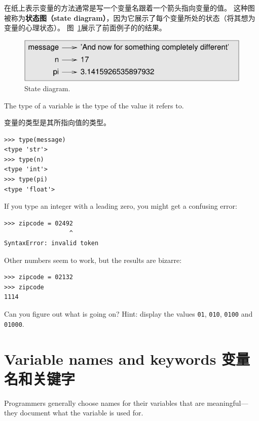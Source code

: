 \documentclass[10pt]{book}
\begin{document}
\begin{CJK}{UTF8}{gbsn}
在纸上表示变量的方法通常是写一个变量名跟着一个箭头指向变量的值。
这种图被称为{\bf 状态图（state diagram）}，因为它展示了每个变量所处的状态（将其想为变量的心理状态）。
图~\ref{fig.state2}展示了前面例子的的结果。

\begin{figure}
\centerline
{\includegraphics[scale=0.8]{figs/state2.pdf}}
\caption{State diagram.}
\label{fig.state2}
\end{figure}

The type of a variable is the type of the value it refers to.

变量的类型是其所指向值的类型。

\begin{verbatim}
>>> type(message)
<type 'str'>
>>> type(n)
<type 'int'>
>>> type(pi)
<type 'float'>
\end{verbatim}

\begin{exercise}

If you type an integer with a leading zero, you might get
a confusing error:

\begin{verbatim}
>>> zipcode = 02492
                  ^
SyntaxError: invalid token
\end{verbatim}

Other numbers seem to work, but the results are bizarre:

\begin{verbatim}
>>> zipcode = 02132
>>> zipcode
1114
\end{verbatim}

Can you figure out what is going on?  Hint: display the
values {\tt 01}, {\tt 010}, {\tt 0100} and {\tt 01000}.

\end{exercise}



\section{Variable names and keywords 变量名和关键字}

Programmers generally choose names for their variables that
are meaningful---they document what the variable is used for.


\end{CJK}
\end{document}
